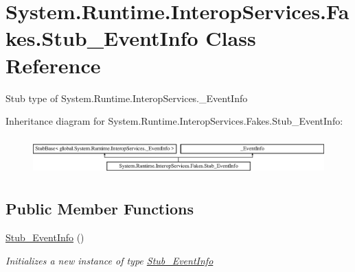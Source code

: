 \hypertarget{class_system_1_1_runtime_1_1_interop_services_1_1_fakes_1_1_stub___event_info}{\section{System.\-Runtime.\-Interop\-Services.\-Fakes.\-Stub\-\_\-\-Event\-Info Class Reference}
\label{class_system_1_1_runtime_1_1_interop_services_1_1_fakes_1_1_stub___event_info}
}


Stub type of System.\-Runtime.\-Interop\-Services.\-\_\-\-Event\-Info 


Inheritance diagram for System.\-Runtime.\-Interop\-Services.\-Fakes.\-Stub\-\_\-\-Event\-Info\-:\begin{figure}[H]
\begin{center}
\leavevmode
\includegraphics[height=1.473684cm]{class_system_1_1_runtime_1_1_interop_services_1_1_fakes_1_1_stub___event_info}
\end{center}
\end{figure}
\subsection*{Public Member Functions}
\begin{DoxyCompactItemize}
\item 
\hyperlink{class_system_1_1_runtime_1_1_interop_services_1_1_fakes_1_1_stub___event_info_a8d7c2194bc03f2562ecfde7f7263c9a6}{Stub\-\_\-\-Event\-Info} ()
\begin{DoxyCompactList}\small\item\em Initializes a new instance of type \hyperlink{class_system_1_1_runtime_1_1_interop_services_1_1_fakes_1_1_stub___event_info}{Stub\-\_\-\-Event\-Info}\end{DoxyCompactList}\end{DoxyCompactItemize}
